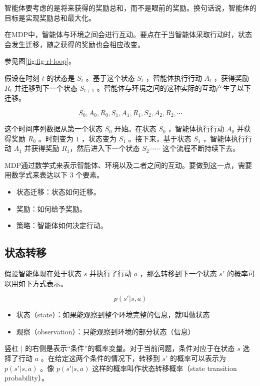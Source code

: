 \documentclass[lang=cn,newtx,10pt,scheme=chinese]{elegantbook}
\begin{document}
智能体要考虑的是将来获得的奖励总和，而不是眼前的奖励。换句话说，智能体的目标是实现奖励总和最大化。

在MDP中，智能体与环境之间会进行互动。要点在于当智能体采取行动时，状态会发生迁移，随之获得的奖励也会相应改变。

参见图\ref{fig:fig-rl-loop}。

假设在时刻 $t$ 的状态是 $S_t$ 。基于这个状态 $S_t$ ，智能体执行行动 $A_t$ ，获得奖励 $R_t$ 并迁移到下一个状态 $S_{t+1}$ 。智能体与环境之间的这种实际的互动产生了以下迁移。

\begin{equation}
S_0,A_0,R_0,S_1,A_1,R_1,S_2,A_2,R_2,\cdots
\end{equation}

这个时间序列数据从第一个状态 $S_0$ 开始。在状态 $S_0$ ，智能体执行行动 $A_0$ 并获得奖励 $R_0$ 。时刻变为 $1$ ，状态变为 $S_1$ 。接下来，基于状态 $S_1$ ，智能体执行行动 $A_1$ 并获得奖励 $R_1$，然后进入下一个状态 $S_2\cdots\cdots$ 这个流程不断持续下去。

MDP通过数学式来表示智能体、环境以及二者之间的互动。要做到这一点，需要用数学式来表达以下 3 个要素。

\begin{itemize}
\item 状态迁移：状态如何迁移。
\item 奖励：如何给予奖励。
\item 策略：智能体如何决定行动。
\end{itemize}

\subsection{状态转移}

假设智能体现在处于状态 $s$ 并执行了行动 $a$ ，那么转移到下一个状态 $s'$ 的概率可以用如下方式表示。

\begin{equation}
p(s'|s,a)
\end{equation}

\begin{marker}
\begin{itemize}
\item 状态（state）：如果能观察到整个环境完整的信息，就叫做状态
\item 观察（observation）：只能观察到环境的部分状态（信息）
\end{itemize}
\end{marker}

竖杠 $\vert$ 的右侧是表示``条件''的概率变量。对于当前问题，条件对应于在状态 $s$ 选择了行动 $a$ 。在给定这两个条件的情况下，转移到 $s'$ 的概率可以表示为 $p(s'|s,a)$ 。像 $p(s'|s,a)$ 这样的概率叫作状态转移概率（state transition probability）。
\end{document}
